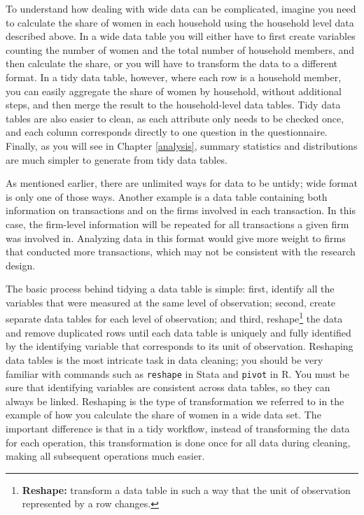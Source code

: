 \documentclass[
]{book}
\begin{document}
To understand how dealing with wide data can be complicated,
imagine you need to calculate the share of women
in each household using the household level data described above.
In a wide data table you will either have to first create variables counting
the number of women and the total number of household members,
and then calculate the share,
or you will have to transform the data to a different format.
In a tidy data table, however, where each row is a household member,
you can easily aggregate the share of women by household,
without additional steps,
and then merge the result to the household-level data tables.
Tidy data tables are also easier to clean,
as each attribute only needs to be checked once,
and each column corresponds directly to one question in the questionnaire.
Finally, as you will see in Chapter \ref{analysis},
summary statistics and distributions are much simpler
to generate from tidy data tables.

As mentioned earlier, there are unlimited ways for data to be untidy;
wide format is only one of those ways.
Another example is a data table containing both information on transactions
and on the firms involved in each transaction.
In this case, the firm-level information will be repeated
for all transactions a given firm was involved in.
Analyzing data in this format would give more weight
to firms that conducted more transactions,
which may not be consistent with the research design.

The basic process behind tidying a data table is simple:
first, identify all the variables that were measured at the same level of observation;
second, create separate data tables for each level of observation;
and third, reshape\footnote{\textbf{Reshape:}
  transform a data table in such a way that the unit of observation represented by a row changes.}
the data and remove duplicated rows
until each data table is uniquely and fully identified by the identifying variable
that corresponds to its unit of observation.
Reshaping data tables is the most intricate task in data cleaning;
you should be very familiar with commands such as
\texttt{reshape} in Stata and \texttt{pivot} in R.
You must be sure that identifying variables are consistent across data tables,
so they can always be linked.
Reshaping is the type of transformation we referred to
in the example of how you calculate
the share of women in a wide data set.
The important difference is that
in a tidy workflow,
instead of transforming the data for each operation,
this transformation is done once for all data during cleaning,
making all subsequent operations much easier.
\end{document}
